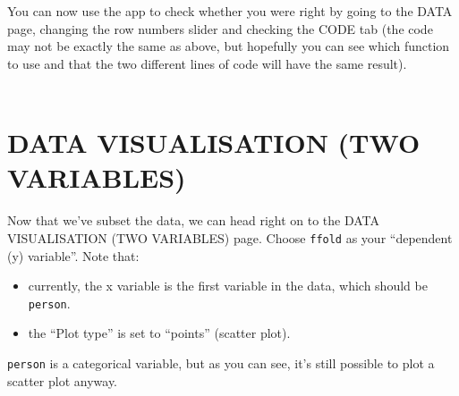 \documentclass[
]{book}
\newenvironment{Shaded}{\begin{snugshade}}{\end{snugshade}}
\newcommand{\CommentTok}[1]{\textcolor[rgb]{0.56,0.35,0.01}{\textit{#1}}}
\newcommand{\DecValTok}[1]{\textcolor[rgb]{0.00,0.00,0.81}{#1}}
\newcommand{\KeywordTok}[1]{\textcolor[rgb]{0.13,0.29,0.53}{\textbf{#1}}}
\newcommand{\NormalTok}[1]{#1}
\newcommand{\OperatorTok}[1]{\textcolor[rgb]{0.81,0.36,0.00}{\textbf{#1}}}
\newcommand{\StringTok}[1]{\textcolor[rgb]{0.31,0.60,0.02}{#1}}
\providecommand{\tightlist}{%
  \setlength{\itemsep}{0pt}\setlength{\parskip}{0pt}}
\begin{document}
\begin{Shaded}
\end{Shaded}

You can now use the app to check whether you were right by going to the
DATA page, changing the row numbers slider and checking the CODE tab
(the code may not be exactly the same as above, but hopefully you can see which
function to use and that the two different lines of code will have the same result).\\
~\\

\hypertarget{data-visualisation-two-variables}{%
\section{DATA VISUALISATION (TWO VARIABLES)}\label{data-visualisation-two-variables}}

Now that we've subset the data, we can head right on to the DATA VISUALISATION
(TWO VARIABLES) page. Choose \texttt{ffold} as your ``dependent (y) variable''. Note that:

\begin{itemize}
\tightlist
\item
  currently, the x variable is the first variable in the data, which should be
  \texttt{person}.
\item
  the ``Plot type'' is set to ``points'' (scatter plot).
\end{itemize}

\texttt{person} is a categorical variable, but as you can see, it's still possible to
plot a scatter plot anyway.
\end{document}
